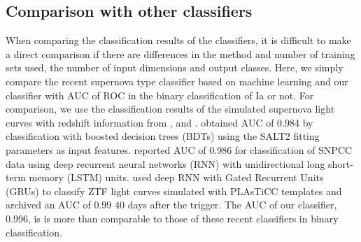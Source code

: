 \documentclass[useamsfonts]{pasj01}
\begin{document}
\subsection{Comparison with other classifiers}
%
When comparing the classification results of the classifiers, it is difficult to make a direct comparison if there are differences in the method and number of training sets used, the number of input dimensions and output classes. 
Here, we simply compare the recent supernova type classifier based on machine learning and our classifier with AUC of ROC in the binary classification of Ia or not.
For comparison, we use the classification results of the simulated supernova light curves with redshift information from \citet{Lochner_2016}, \citet{charnock17a} and \citep{Muthukrishna_2019}.
\citet{Lochner_2016} obtained AUC of 0.984 by classification with boosted decision trees (BDTs) using the SALT2 fitting parameters as input features.
\citet{charnock17a} reported AUC of 0.986 for classification of SNPCC data using deep recurrent neural networks (RNN) with unidirectional long short-term memory (LSTM) units.
\citep{Muthukrishna_2019} used deep RNN with Gated Recurrent Units (GRUs) to classify  ZTF light curves simulated with PLAsTiCC templates and archived an AUC of 0.99 40 days after the trigger.
The AUC of our classifier, 0.996, is is more than comparable to those of these recent classifiers in binary classification.
\end{document}
